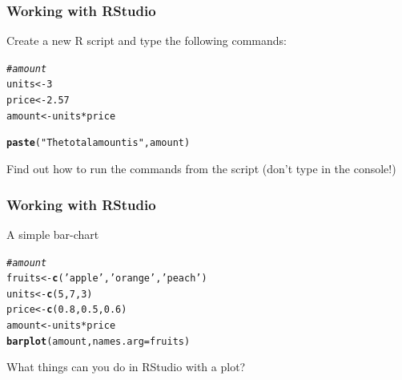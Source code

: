 \documentclass[12pt]{beamer}\usepackage[]{graphicx}\usepackage[]{color}
\makeatletter
\newcommand{\hlnum}[1]{\textcolor[rgb]{0.686,0.059,0.569}{#1}}%
\newcommand{\hlstr}[1]{\textcolor[rgb]{0.192,0.494,0.8}{#1}}%
\newcommand{\hlcom}[1]{\textcolor[rgb]{0.678,0.584,0.686}{\textit{#1}}}%
\newcommand{\hlopt}[1]{\textcolor[rgb]{0,0,0}{#1}}%
\newcommand{\hlstd}[1]{\textcolor[rgb]{0.345,0.345,0.345}{#1}}%
\newcommand{\hlkwb}[1]{\textcolor[rgb]{0.69,0.353,0.396}{#1}}%
\newcommand{\hlkwc}[1]{\textcolor[rgb]{0.333,0.667,0.333}{#1}}%
\newcommand{\hlkwd}[1]{\textcolor[rgb]{0.737,0.353,0.396}{\textbf{#1}}}%
\newenvironment{kframe}{%
 \def\at@end@of@kframe{}%
 \ifinner\ifhmode%
  \def\at@end@of@kframe{\end{minipage}}%
  \begin{minipage}{\columnwidth}%
 \fi\fi%
 \def\FrameCommand##1{\hskip\@totalleftmargin \hskip-\fboxsep
 \colorbox{shadecolor}{##1}\hskip-\fboxsep
     \hskip-\linewidth \hskip-\@totalleftmargin \hskip\columnwidth}%
 \MakeFramed {\advance\hsize-\width
   \@totalleftmargin\z@ \linewidth\hsize
   \@setminipage}}%
 {\par\unskip\endMakeFramed%
 \at@end@of@kframe}
\newenvironment{knitrout}{}{} %
\makeatother
\begin{document}

\begin{frame}[fragile]
\frametitle{Working with RStudio}

Create a new R script and type the following commands:
\begin{knitrout}\footnotesize
{}\color{fgcolor}\begin{kframe}
\begin{alltt}
\hlcom{# amount}
\hlstd{units} \hlkwb{<-} \hlnum{3}
\hlstd{price} \hlkwb{<-} \hlnum{2.57}
\hlstd{amount} \hlkwb{<-} \hlstd{units} \hlopt{*} \hlstd{price}

\hlkwd{paste}\hlstd{(}\hlstr{"The total amount is"}\hlstd{, amount)}
\end{alltt}
\end{kframe}
\end{knitrout}

Find out how to run the commands from the script (don't type in the console!)

\end{frame}


\begin{frame}[fragile]
\frametitle{Working with RStudio}

A simple bar-chart
\begin{knitrout}\footnotesize
{}\color{fgcolor}\begin{kframe}
\begin{alltt}
\hlcom{# amount}
\hlstd{fruits} \hlkwb{<-} \hlkwd{c}\hlstd{(}\hlstr{'apple'}\hlstd{,} \hlstr{'orange'}\hlstd{,} \hlstr{'peach'}\hlstd{)}
\hlstd{units} \hlkwb{<-} \hlkwd{c}\hlstd{(}\hlnum{5}\hlstd{,} \hlnum{7}\hlstd{,} \hlnum{3}\hlstd{)}
\hlstd{price} \hlkwb{<-} \hlkwd{c}\hlstd{(}\hlnum{0.8}\hlstd{,} \hlnum{0.5}\hlstd{,} \hlnum{0.6}\hlstd{)}
\hlstd{amount} \hlkwb{<-} \hlstd{units} \hlopt{*} \hlstd{price}
\hlkwd{barplot}\hlstd{(amount,} \hlkwc{names.arg} \hlstd{= fruits)}
\end{alltt}
\end{kframe}
\end{knitrout}

What things can you do in RStudio with a plot?

\end{frame}

\end{document}
